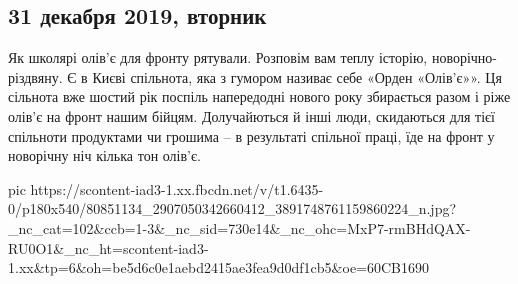  
 
 
 
 
\subsection{31 декабря 2019, вторник}
\label{sec:31_12_2019}

Як школярі олів'є для фронту рятували.
Розповім вам теплу історію, новорічно-різдвяну. 
Є в Києві спільнота, яка з гумором називає себе «Орден «Олів’є»». Ця сільнота вже шостий рік поспіль напередодні нового року збирається разом і ріже олів’є на фронт нашим бійцям. Долучайються й інші люди, скидаються для тієї спільноти продуктами чи грошима – в результаті спільної праці, їде на фронт у новорічну ніч кілька тон олів’є.

\ifcmt
  pic https://scontent-iad3-1.xx.fbcdn.net/v/t1.6435-0/p180x540/80851134_2907050342660412_3891748761159860224_n.jpg?_nc_cat=102&ccb=1-3&_nc_sid=730e14&_nc_ohc=MxP7-rmBHdQAX-RU0O1&_nc_ht=scontent-iad3-1.xx&tp=6&oh=be5d6c0e1aebd2415ae3fea9d0df1cb5&oe=60CB1690
\fi


